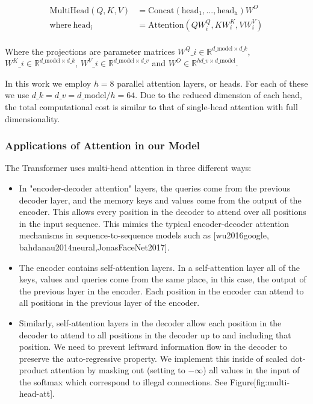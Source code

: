 \documentclass[11pt,a4paper]{article}
\begin{document}
$$\begin{align*}
    \mathrm{MultiHead}(Q, K, V) &= \mathrm{Concat}(\mathrm{head_1}, ..., \mathrm{head_h})W^O\\
    \text{where}~\mathrm{head_i} &= \mathrm{Attention}(QW^Q_i, KW^K_i, VW^V_i)\\
\end{align*}$$

Where the projections are parameter matrices $W^Q\_i \in \mathbb{R}^{d\_{\text{model}} \times d\_k}$, $W^K\_i \in \mathbb{R}^{d\_{\text{model}} \times d\_k}$, $W^V\_i \in \mathbb{R}^{d\_{\text{model}} \times d\_v}$ and $W^O \in \mathbb{R}^{hd\_v \times d\_{\text{model}}}$.

In this work we employ $h=8$ parallel attention layers, or heads. For each of these we use $d\_k=d\_v=d\_{\text{model}}/h=64$.
Due to the reduced dimension of each head, the total computational cost is similar to that of single-head attention with full dimensionality.

\subsubsection{Applications of Attention in our Model}

The Transformer uses multi-head attention in three different ways:

\begin{itemize}
\item In "encoder-decoder attention" layers, the queries come from the previous decoder layer, and the memory keys and values come from the output of the encoder.   This allows every position in the decoder to attend over all positions in the input sequence.  This mimics the typical encoder-decoder attention mechanisms in sequence-to-sequence models such as [wu2016google, bahdanau2014neural,JonasFaceNet2017].
\item The encoder contains self-attention layers.  In a self-attention layer all of the keys, values and queries come from the same place, in this case, the output of the previous layer in the encoder.   Each position in the encoder can attend to all positions in the previous layer of the encoder.
\item Similarly, self-attention layers in the decoder allow each position in the decoder to attend to all positions in the decoder up to and including that position.  We need to prevent leftward information flow in the decoder to preserve the auto-regressive property.  We implement this inside of scaled dot-product attention by masking out (setting to $-\infty$) all values in the input of the softmax which correspond to illegal connections.  See Figure[fig:multi-head-att].
\end{itemize}
\end{document}
